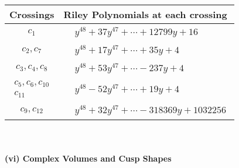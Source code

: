 \documentclass[1p]{elsarticle_modified}
\theoremstyle{definition}
\begin{document}
\begin{tabular}{m{50pt}|m{274pt}}
Crossings & \hspace{64pt}Riley Polynomials at each crossing \\
\hline $$\begin{aligned}c_{1}\end{aligned}$$&$\begin{aligned}
&y^{48}+37 y^{47}+\cdots+12799 y+16
\end{aligned}$\\
\hline $$\begin{aligned}c_{2},c_{7}\end{aligned}$$&$\begin{aligned}
&y^{48}+17 y^{47}+\cdots+35 y+4
\end{aligned}$\\
\hline $$\begin{aligned}c_{3},c_{4},c_{8}\end{aligned}$$&$\begin{aligned}
&y^{48}+53 y^{47}+\cdots-237 y+4
\end{aligned}$\\
\hline $$\begin{aligned}c_{5},c_{6},c_{10}\\c_{11}\end{aligned}$$&$\begin{aligned}
&y^{48}-52 y^{47}+\cdots+19 y+4
\end{aligned}$\\
\hline $$\begin{aligned}c_{9},c_{12}\end{aligned}$$&$\begin{aligned}
&y^{48}+32 y^{47}+\cdots-318369 y+1032256
\end{aligned}$\\
\hline
\end{tabular}\\~\\
\newpage\flushleft \textbf{(vi) Complex Volumes and Cusp Shapes}
\end{document}
